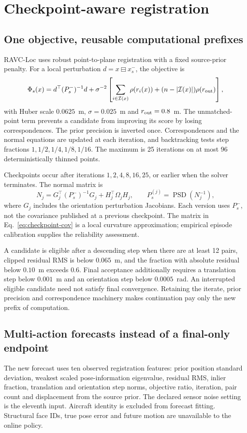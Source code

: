 \section{Checkpoint-aware registration}\label{sec:method}
\subsection{One objective, reusable computational prefixes}
RAVC-Loc uses robust point-to-plane registration with a fixed source-prior penalty. For a local perturbation $d=x\boxminus x_s^-$, the objective is
\begin{equation}
\Phi_s(x)=d^\top(P_s^-)^{-1}d+
\sigma^{-2}\left[\sum_{i\in\mathcal I(x)}\rho(r_i(x))+(n-|\mathcal I(x)|)\rho(r_{\rm out})\right],\label{eq:objective}
\end{equation}
with Huber scale $0.0625$~m, $\sigma=0.025$~m and $r_{\rm out}=0.8$~m. The unmatched-point term prevents a candidate from improving its score by losing correspondences. The prior precision is inverted once. Correspondences and the normal equations are updated at each iteration, and backtracking tests step fractions $1,1/2,1/4,1/8,1/16$. The maximum is 25 iterations on at most 96 deterministically thinned points.

Checkpoints occur after iterations $1,2,4,8,16,25$, or earlier when the solver terminates. The normal matrix is
\begin{equation}
N_j=G_j^\top(P_s^-)^{-1}G_j+H_j^\top\Omega_jH_j,\qquad P_s^{(j)}=\operatorname{PSD}(N_j^{-1}),\label{eq:checkpoint-cov}
\end{equation}
where $G_j$ includes the orientation perturbation Jacobians. Each version uses $P_s^-$, not the covariance published at a previous checkpoint. The matrix in Eq.~\eqref{eq:checkpoint-cov} is a local curvature approximation; empirical episode calibration supplies the reliability assessment.

A candidate is eligible after a descending step when there are at least 12 pairs, clipped residual RMS is below $0.065$~m, and the fraction with absolute residual below $0.10$~m exceeds $0.6$. Final acceptance additionally requires a translation step below $0.001$~m and an orientation step below $0.0005$~rad. An interrupted eligible candidate need not satisfy final convergence. Retaining the iterate, prior precision and correspondence machinery makes continuation pay only the new prefix of computation.


\subsection{Multi-action forecasts instead of a final-only endpoint}
The new forecast uses ten observed registration features: prior position standard deviation, weakest scaled pose-information eigenvalue, residual RMS, inlier fraction, translation and orientation step norms, objective ratio, iteration, pair count and displacement from the source prior. The declared sensor noise setting is the eleventh input. Aircraft identity is excluded from forecast fitting. Structural face IDs, true pose error and future motion are unavailable to the online policy.

